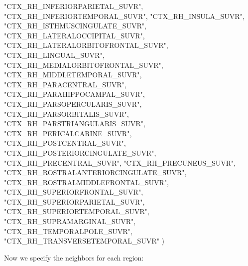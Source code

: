 \documentclass[
]{article}
\newenvironment{Shaded}{\begin{snugshade}}{\end{snugshade}}
\newcommand{\NormalTok}[1]{#1}
\newcommand{\StringTok}[1]{\textcolor[rgb]{0.31,0.60,0.02}{#1}}
\begin{document}
\begin{Shaded}
\begin{Highlighting}[]
  \StringTok{"CTX_RH_INFERIORPARIETAL_SUVR"}\NormalTok{, }\StringTok{"CTX_RH_INFERIORTEMPORAL_SUVR"}\NormalTok{,       }
  \StringTok{"CTX_RH_INSULA_SUVR"}\NormalTok{, }\StringTok{"CTX_RH_ISTHMUSCINGULATE_SUVR"}\NormalTok{,        }
  \StringTok{"CTX_RH_LATERALOCCIPITAL_SUVR"}\NormalTok{, }\StringTok{"CTX_RH_LATERALORBITOFRONTAL_SUVR"}\NormalTok{,    }
  \StringTok{"CTX_RH_LINGUAL_SUVR"}\NormalTok{, }\StringTok{"CTX_RH_MEDIALORBITOFRONTAL_SUVR"}\NormalTok{,     }
  \StringTok{"CTX_RH_MIDDLETEMPORAL_SUVR"}\NormalTok{, }\StringTok{"CTX_RH_PARACENTRAL_SUVR"}\NormalTok{,             }
  \StringTok{"CTX_RH_PARAHIPPOCAMPAL_SUVR"}\NormalTok{, }\StringTok{"CTX_RH_PARSOPERCULARIS_SUVR"}\NormalTok{,         }
  \StringTok{"CTX_RH_PARSORBITALIS_SUVR"}\NormalTok{, }\StringTok{"CTX_RH_PARSTRIANGULARIS_SUVR"}\NormalTok{,        }
  \StringTok{"CTX_RH_PERICALCARINE_SUVR"}\NormalTok{, }\StringTok{"CTX_RH_POSTCENTRAL_SUVR"}\NormalTok{,             }
  \StringTok{"CTX_RH_POSTERIORCINGULATE_SUVR"}\NormalTok{, }\StringTok{"CTX_RH_PRECENTRAL_SUVR"}\NormalTok{,              }
  \StringTok{"CTX_RH_PRECUNEUS_SUVR"}\NormalTok{, }\StringTok{"CTX_RH_ROSTRALANTERIORCINGULATE_SUVR"}\NormalTok{,}
  \StringTok{"CTX_RH_ROSTRALMIDDLEFRONTAL_SUVR"}\NormalTok{, }\StringTok{"CTX_RH_SUPERIORFRONTAL_SUVR"}\NormalTok{,         }
  \StringTok{"CTX_RH_SUPERIORPARIETAL_SUVR"}\NormalTok{, }\StringTok{"CTX_RH_SUPERIORTEMPORAL_SUVR"}\NormalTok{,        }
  \StringTok{"CTX_RH_SUPRAMARGINAL_SUVR"}\NormalTok{, }\StringTok{"CTX_RH_TEMPORALPOLE_SUVR"}\NormalTok{,            }
  \StringTok{"CTX_RH_TRANSVERSETEMPORAL_SUVR"}
\NormalTok{)}
\end{Highlighting}
\end{Shaded}

Now we specify the neighbors for each region:
\end{document}
